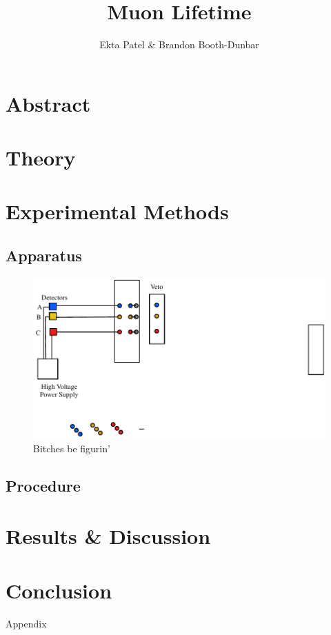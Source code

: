 
\newcommand{\ig}[2][width=4in]{\texttt{[image: \#2]}}    		
\usepackage{graphicx}					
\usepackage{amssymb}
\usepackage{pgfplotstable}
\usepackage{float}
\usepackage{caption}
\captionsetup[table]{justification=justified,singlelinecheck=false, position=bottom}


\header {\today}							
\title{Muon Lifetime}
\author{Ekta Patel \& Brandon Booth-Dunbar}

\section{Abstract}
\begin{em}
\end{em}

\section{Theory}

\section{Experimental Methods}
\subsection{Apparatus}
\begin{figure}[H]
\begin{center}
\includegraphics[width=4 in]{ML-figure1.pdf}
\caption{Bitches be figurin'}
\end{center}
\end{figure}

\subsection{Procedure}


\section{Results \& Discussion}

\section{Conclusion}

\begin{thebibliography}{99}
\end{thebibliography}

\newpage \LARGE{Appendix}

  